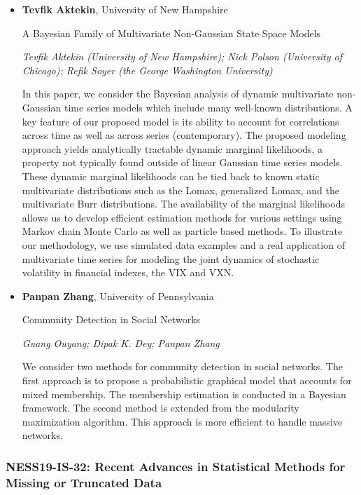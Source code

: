 \begin{itemize}
\item \textbf{Tevfik Aktekin}, University of New Hampshire

A Bayesian Family of Multivariate Non-Gaussian State Space Models

\emph{\footnotesize Tevfik Aktekin (University of New Hampshire); Nick Polson (University of Chicago); Refik Soyer (the George Washington University)}

In this paper, we consider the Bayesian analysis of dynamic multivariate non-Gaussian time series models which include many well-known distributions. A key feature of our proposed model is its ability to account for correlations across time as well as across series (contemporary). The proposed modeling approach yields analytically tractable dynamic marginal likelihoods, a property not typically found outside of linear Gaussian time series models. These dynamic marginal likelihoods can be tied back to known static multivariate distributions such as the Lomax, generalized Lomax, and the multivariate Burr distributions. The availability of the marginal likelihoods allows us to develop efficient estimation methods for various settings using Markov chain Monte Carlo as well as particle based methods. To illustrate our methodology, we use simulated data examples and a real application of multivariate time series for modeling the joint dynamics of stochastic volatility in financial indexes, the VIX and VXN.

\item \textbf{Panpan Zhang}, University of Pennsylvania

Community Detection in Social Networks

\emph{\footnotesize Guang Ouyang; Dipak K. Dey; Panpan Zhang}

We consider two methods for community detection in social networks. The first approach is to propose a probabilistic graphical model that accounts for mixed membership. The membership estimation is conducted in a Bayesian framework. The second method is extended from the modularity maximization algorithm. This approach is more efficient to handle massive networks.

\end{itemize}

\subsubsection*{NESS19-IS-32: Recent Advances in Statistical Methods for Missing or Truncated Data}


